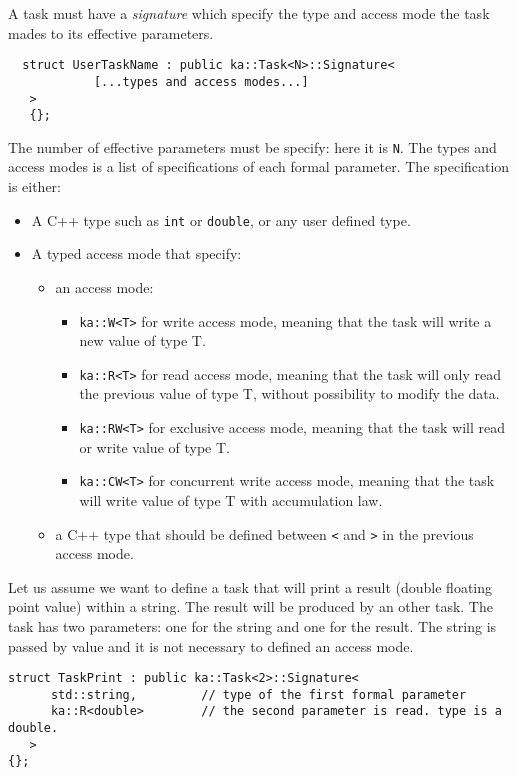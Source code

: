 A task must have a \textit{signature} which specify the type and access mode the task mades to its effective parameters.
\begin{center}
\begin{boxit}
\begin{verbatim}
  struct UserTaskName : public ka::Task<N>::Signature< 
            [...types and access modes...] 
   > 
   {};
\end{verbatim}
\end{boxit}
\end{center}
The number of effective parameters must be specify: here it is \verb+N+.
The types and access modes is a list of specifications of each formal parameter.
The specification is either:
\begin{itemize}
\item A C++ type such as \verb+int+ or \verb+double+, or any user defined type.
\item A typed access mode that specify:
  \begin{itemize}
  \item an access mode: 
	  \begin{itemize}
	  \item \verb+ka::W<T>+ for write access mode, meaning that the task will write a new value of type T.
	  \item \verb+ka::R<T>+ for read access mode, meaning that the task will only read the previous value of type T, without possibility to modify the data.
	  \item \verb+ka::RW<T>+ for exclusive access mode, meaning that the task will read or write value of type T.
	  \item \verb+ka::CW<T>+ for concurrent write access mode, meaning that the task will write value of type T with accumulation law.
	  \end{itemize}
  \item a C++ type that should be defined between \verb+<+ and \verb+>+ in the previous access mode.
  \end{itemize}
\end{itemize}

Let us assume we want to define a task that will print a result (double floating point value) within a string. The result will be produced by an other task.
The task has two parameters: one for the string and one for the result. 
The string is passed by value and it is not necessary to defined an access mode.
\begin{center}
\begin{boxit}
\begin{verbatim}
struct TaskPrint : public ka::Task<2>::Signature< 
      std::string,         // type of the first formal parameter
      ka::R<double>        // the second parameter is read. type is a double.
   > 
{};
\end{verbatim}
\end{boxit}
\end{center}

